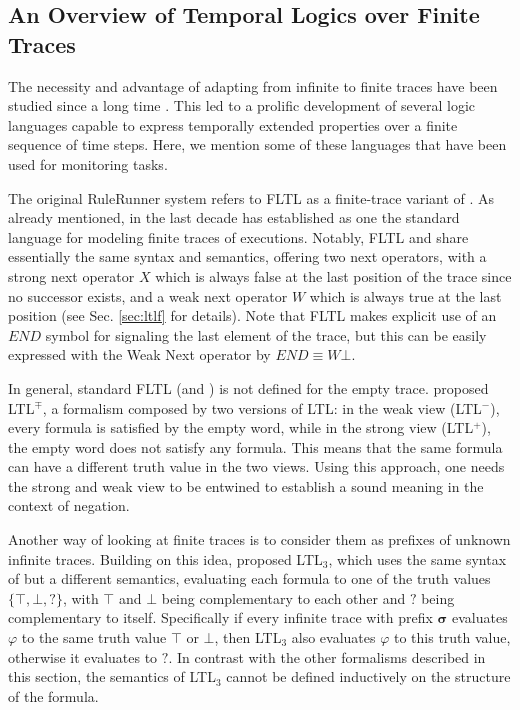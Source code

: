 \subsection{An Overview of Temporal Logics over Finite Traces}
\label{sec:overview}

The necessity and advantage of adapting \ltl from infinite to finite traces have been studied since a long time \cite{lichtenstein1985glory,manna1995temporal}. This led to a prolific development of several logic languages capable to express temporally extended properties over a finite sequence of time steps. Here, we mention some of these languages that have been used for monitoring tasks.

The original RuleRunner system \cite{perotti2015runtime} refers to FLTL as a finite-trace variant of \ltl. As already mentioned, in the last decade \ltlf \cite{de2013linear,GiacomoV15,CamachoBM19} has established as one the standard language for modeling finite traces of executions. Notably, FLTL and \ltlf share essentially the same syntax and semantics, offering two next operators, with a strong next operator $X$ which is always false at the last position of the trace since no successor exists, and a weak next operator $W$ which is always true at the last position (see Sec. \ref{sec:ltlf} for details).
Note that FLTL makes explicit use of an $\textit{END}$ symbol for signaling the last element of the trace, but this can be easily expressed with the Weak Next operator by $\textit{END} \equiv W  \bot$.

In general, standard FLTL (and \ltlf) is not defined for the empty trace. \cite{eisner2003reasoning} proposed LTL$^\mp$, a formalism composed by two versions of LTL: in the weak view (LTL$^-$), every formula is satisfied by the empty word, while in the strong view (LTL$^+$), the empty word does not satisfy any formula. This means that the same formula can have a different truth value in the two views. Using this approach, one needs the strong and weak view to be entwined to establish a sound meaning in the context of negation. 

Another way of looking at finite traces is to consider them as prefixes of unknown infinite traces. Building on this idea, \cite{arafat2005runtime,bauer2006monitoring} proposed LTL$_3$, which uses the same syntax of \ltlf but a different semantics, evaluating each formula to one of the truth values $\{ \top, \bot, ? \}$, with $\top$ and $\bot$ being complementary to each other and $?$ being complementary to itself. Specifically if every infinite trace with prefix $\boldsymbol{\sigma}$ evaluates $\varphi$ to the same truth value $\top$ or $\bot$, then LTL$_3$ also evaluates $\varphi$ to this truth value, otherwise it evaluates to $?$. In contrast with the other formalisms described in this section, the semantics of LTL$_3$ cannot be defined inductively on the structure of the formula.

